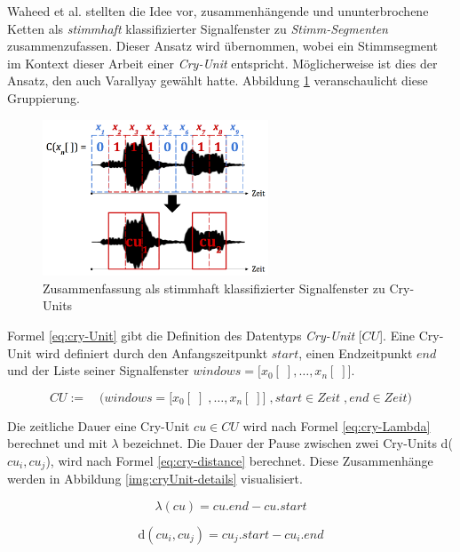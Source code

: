 Waheed et al. \cite{vad_entropy} stellten die Idee vor, zusammenhängende und ununterbrochene Ketten als \emph{stimmhaft} klassifizierter Signalfenster zu \emph{Stimm-Segmenten} zusammenzufassen. Dieser Ansatz wird übernommen, wobei ein Stimmsegment im Kontext dieser Arbeit einer \emph{Cry-Unit} entspricht. Möglicherweise ist dies der Ansatz, den auch  Varallyay \cite[S. 16 - 17]{cry_thesis} gewählt hatte. Abbildung \ref{img:cryUnit} veranschaulicht diese Gruppierung. 

\begin{figure}[h]
	\centering
	\includegraphics[width=0.6\textwidth]{bilder/cry-Unit02.png}
	\caption{Zusammenfassung als stimmhaft klassifizierter Signalfenster zu Cry-Units}
	\label{img:cryUnit}
\end{figure}

Formel \ref{eq:cry-Unit} gibt die Definition des Datentyps \emph{Cry-Unit} [$CU$]. Eine Cry-Unit wird definiert durch den Anfangszeitpunkt $start$, einen Endzeitpunkt $end$ und der Liste seiner Signalfenster $windows = \big[x_0[\;], \ldots, x_n[\;]\big]$.

\begin{equation}
CU := \quad \Big(windows = \big[x_0[\;] \; ,\ldots, x_n[\;] \big] \;, start \in Zeit \;, end \in Zeit \Big)
\label{eq:cry-Unit}
\end{equation}

Die zeitliche Dauer eine Cry-Unit $cu \in CU$ wird nach Formel \ref{eq:cry-Lambda} berechnet und mit $\lambda$ bezeichnet. Die Dauer der Pause zwischen zwei Cry-Units d($cu_i, cu_j$), wird nach Formel \ref{eq:cry-distance} berechnet. Diese Zusammenhänge werden in Abbildung \ref{img:cryUnit-details} visualisiert.\cite[S. 2]{vad_entropy}

\begin{equation}
\lambda (cu) = cu.end - cu.start
\label{eq:cry-Lambda}
\end{equation}

\begin{equation}
\text{d}(cu_i, cu_j) = cu_j.start - cu_i.end
\label{eq:cry-distance}
\end{equation}

